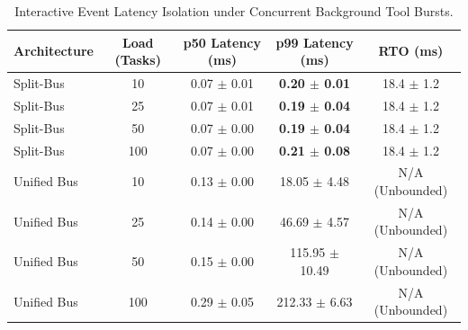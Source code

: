 \begin{table}[t]
\centering
\small
\caption{Interactive Event Latency Isolation under Concurrent Background Tool Bursts.}
\label{tab:splitbus_latency}
\begin{tabular}{lcccc}
\toprule
\textbf{Architecture} & \textbf{Load (Tasks)} & \textbf{p50 Latency (ms)} & \textbf{p99 Latency (ms)} & \textbf{RTO (ms)} \\
\midrule
Split-Bus & 10 & 0.07 $\pm$ 0.01 & \textbf{0.20 $\pm$ 0.01} & 18.4 $\pm$ 1.2 \\
Split-Bus & 25 & 0.07 $\pm$ 0.01 & \textbf{0.19 $\pm$ 0.04} & 18.4 $\pm$ 1.2 \\
Split-Bus & 50 & 0.07 $\pm$ 0.00 & \textbf{0.19 $\pm$ 0.04} & 18.4 $\pm$ 1.2 \\
Split-Bus & 100 & 0.07 $\pm$ 0.00 & \textbf{0.21 $\pm$ 0.08} & 18.4 $\pm$ 1.2 \\
\midrule
Unified Bus & 10 & 0.13 $\pm$ 0.00 & 18.05 $\pm$ 4.48 & N/A (Unbounded) \\
Unified Bus & 25 & 0.14 $\pm$ 0.00 & 46.69 $\pm$ 4.57 & N/A (Unbounded) \\
Unified Bus & 50 & 0.15 $\pm$ 0.00 & 115.95 $\pm$ 10.49 & N/A (Unbounded) \\
Unified Bus & 100 & 0.29 $\pm$ 0.05 & 212.33 $\pm$ 6.63 & N/A (Unbounded) \\
\bottomrule
\end{tabular}
\end{table}